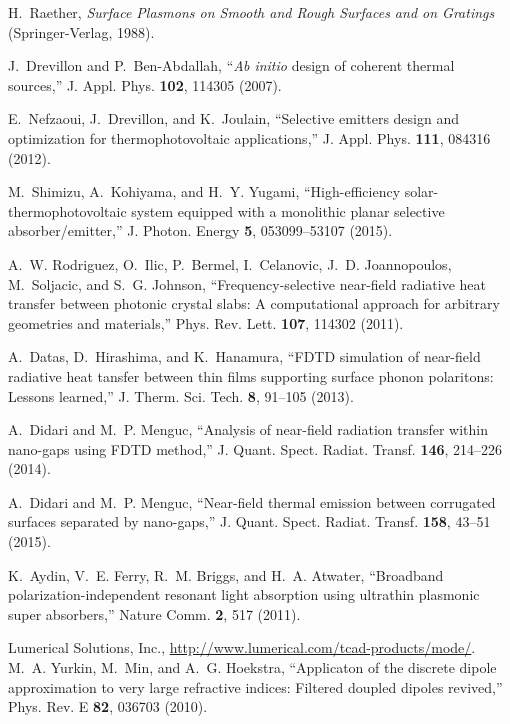\documentclass[10pt,letterpaper]{article}
\begin{document}
\begin{thebibliography}{100}
H.~Raether, \emph{Surface Plasmons on Smooth and Rough Surfaces and on
  Gratings} (Springer-Verlag, 1988).

J.~Drevillon and P.~Ben-Abdallah, \enquote{{\it Ab initio} design of coherent
  thermal sources,} J. Appl. Phys. \textbf{102}, 114305 (2007).

E.~Nefzaoui, J.~Drevillon, and K.~Joulain, \enquote{Selective emitters design
  and optimization for thermophotovoltaic applications,} J. Appl. Phys.
  \textbf{111}, 084316 (2012).

M.~Shimizu, A.~Kohiyama, and H.~Y. Yugami, \enquote{High-efficiency
  solar-thermophotovoltaic system equipped with a monolithic planar selective
  absorber/emitter,} J. Photon. Energy \textbf{5}, 053099--53107 (2015).

A.~W. Rodriguez, O.~Ilic, P.~Bermel, I.~Celanovic, J.~D. Joannopoulos,
  M.~Soljacic, and S.~G. Johnson, \enquote{Frequency-selective near-field
  radiative heat transfer between photonic crystal slabs: A computational
  approach for arbitrary geometries and materials,} Phys. Rev. Lett.
  \textbf{107}, 114302 (2011).

A.~Datas, D.~Hirashima, and K.~Hanamura, \enquote{{FDTD} simulation of
  near-field radiative heat tansfer between thin films supporting surface
  phonon polaritons: Lessons learned,} J. Therm. Sci. Tech. \textbf{8}, 91--105
  (2013).

A.~Didari and M.~P. Menguc, \enquote{Analysis of near-field radiation transfer
  within nano-gaps using {FDTD} method,} J. Quant. Spect. Radiat. Transf.
  \textbf{146}, 214--226 (2014).

A.~Didari and M.~P. Menguc, \enquote{Near-field thermal emission between
  corrugated surfaces separated by nano-gaps,} J. Quant. Spect. Radiat. Transf.
  \textbf{158}, 43--51 (2015).

K.~Aydin, V.~E. Ferry, R.~M. Briggs, and H.~A. Atwater, \enquote{Broadband
  polarization-independent resonant light absorption using ultrathin plasmonic
  super absorbers,} Nature Comm. \textbf{2}, 517 (2011).

{Lumerical Solutions, Inc.},
  \url{http://www.lumerical.com/tcad-products/mode/}.
M.~A. Yurkin, M.~Min, and A.~G. Hoekstra, \enquote{Applicaton of the discrete
  dipole approximation to very large refractive indices: Filtered doupled
  dipoles revived,} Phys. Rev. E \textbf{82}, 036703 (2010).


\end{thebibliography}
\end{document}
